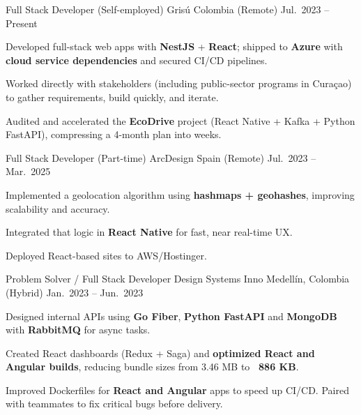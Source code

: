 \begin{cventries}
  \cventry
  {Full Stack Developer (Self-employed)}
  {Grisú}
  {Colombia (Remote)}
  {Jul.\ 2023 -- Present}
  {
    \begin{cvitems}
      \item {Developed full-stack web apps with \textbf{NestJS} + \textbf{React}; shipped to \textbf{Azure} with \textbf{cloud service dependencies} and secured CI/CD pipelines.}
      \item {Worked directly with stakeholders (including public-sector programs in Curaçao) to gather requirements, build quickly, and iterate.}
      \item {Audited and accelerated the \textbf{EcoDrive} project (React Native + Kafka + Python FastAPI), compressing a 4-month plan into weeks.}
    \end{cvitems}
  }

  \cventry
  {Full Stack Developer (Part-time)}
  {ArcDesign}
  {Spain (Remote)}
  {Jul.\ 2023 -- Mar.\ 2025}
  {
    \begin{cvitems}
      \item {Implemented a geolocation algorithm using \textbf{hashmaps + geohashes}, improving scalability and accuracy.}
      \item {Integrated that logic in \textbf{React Native} for fast, near real-time UX.}
      \item {Deployed React-based sites to AWS/Hostinger.}
    \end{cvitems}
  }

  \cventry
  {Problem Solver / Full Stack Developer}
  {Design Systems Inno}
  {Medellín, Colombia (Hybrid)}
  {Jan.\ 2023 -- Jun.\ 2023}
  {
    \begin{cvitems}
      \item {Designed internal APIs using \textbf{Go Fiber}, \textbf{Python FastAPI} and \textbf{MongoDB} with \textbf{RabbitMQ} for async tasks.}
      \item {Created React dashboards (Redux + Saga) and \textbf{optimized React and Angular builds}, reducing bundle sizes from 3.46 MB to \textbf{~886 KB}.}
      \item {Improved Dockerfiles for \textbf{React and Angular} apps to speed up CI/CD. Paired with teammates to fix critical bugs before delivery.}
    \end{cvitems}
  }


\end{cventries}
